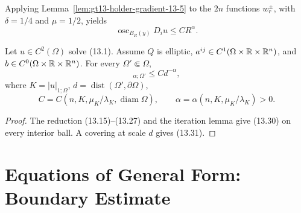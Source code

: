 Applying Lemma~\ref{lem:gt13-holder-gradient-13-5} to the $2n$ functions
$w_r^\pm$, with $\delta=1/4$ and $\mu=1/2$, yields
\begin{equation}
\operatorname{osc}_{B_R(y)}D_iu\le CR^\alpha.
\tag{13.30}
\end{equation}

\begin{theorem}
\label{thm:gt13-holder-gradient-13-6}
Let $u\in C^2(\Omega)$ solve \textup{(13.1)}.  Assume $Q$ is elliptic,
$a^{ij}\in C^1(\Omega\times\mathbb{R}\times\mathbb{R}^n)$, and
$b\in C^0(\Omega\times\mathbb{R}\times\mathbb{R}^n)$.  For every
$\Omega'\Subset\Omega$,
\begin{equation}
[Du]_{\alpha;\Omega'}\le Cd^{-\alpha},
\tag{13.31}
\end{equation}
where $K=|u|_{1;\Omega}$, $d=\operatorname{dist}(\Omega',\partial\Omega)$,
\[
C=C(n,K,\mu_K/\lambda_K,\operatorname{diam}\Omega),
\qquad
\alpha=\alpha(n,K,\mu_K/\lambda_K)>0.
\]
\end{theorem}
\begin{proof}
\sketch The reduction \textup{(13.15)--(13.27)} and the iteration lemma
give \textup{(13.30)} on every interior ball.  A covering at scale $d$
gives \textup{(13.31)}.
\end{proof}

\section{Equations of General Form: Boundary Estimate}

